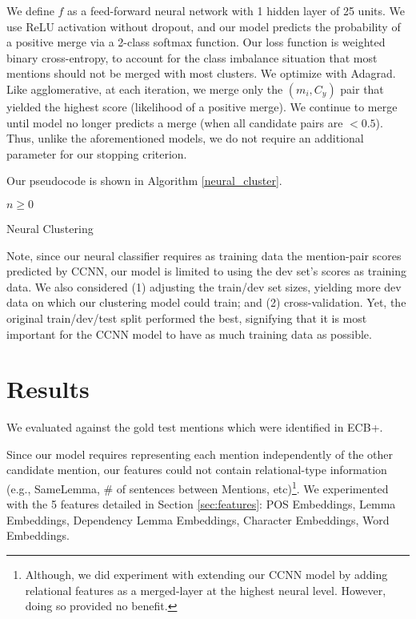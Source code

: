 \documentclass[11pt,a4paper]{article}
\begin{document}
We define $f$ as a feed-forward neural network with 1 hidden layer of 25 units.  We use ReLU activation without dropout, and our model predicts the probability of a positive merge via a 2-class softmax function.  Our loss function is weighted binary cross-entropy, to account for the class imbalance situation that most mentions should not be merged with most clusters.  We optimize with Adagrad.  Like agglomerative, at each iteration, we merge only the $(m_i,C_y)$ pair that yielded the highest score (likelihood of a positive merge).  We continue to merge until model no longer predicts a merge (when all candidate pairs are $< 0.5$).  Thus, unlike the aforementioned models, we do not require an additional parameter for our stopping criterion.

Our pseudocode is shown in Algorithm \ref{neural_cluster}.

\begin{algorithm}
    \begin{algorithmic}[1]
       \Require $n \geq 0$
    \end{algorithmic}
\caption{Neural Clustering}
\label{neural_cluster}
\end{algorithm}

Note, since our neural classifier requires as training data the mention-pair scores predicted by CCNN, our model is limited to using the dev set's scores as training data.  We also considered (1) adjusting the train/dev set sizes, yielding more dev data on which our clustering model could train; and (2) cross-validation.  Yet, the original train/dev/test split performed the best, signifying that it is most important for the CCNN model to have as much training data as possible.

\section{Results}
We evaluated against the gold test mentions which were identified in ECB+.

Since our model requires representing each mention independently of the other candidate mention, our features could not contain relational-type information (e.g., SameLemma, \# of sentences between Mentions, etc)\footnote{Although, we did experiment with extending our CCNN model by adding relational features as a merged-layer at the highest neural level.  However, doing so provided no benefit.}.  We experimented with the 5 features detailed in Section \ref{sec:features}: POS Embeddings, Lemma Embeddings, Dependency Lemma Embeddings, Character Embeddings, Word Embeddings.
\end{document}
